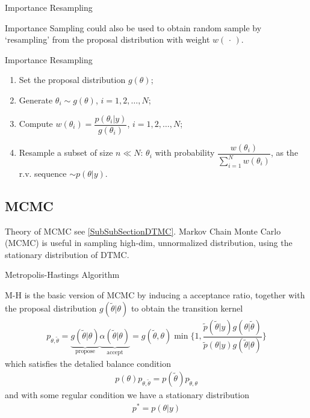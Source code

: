 \begin{point}
    Importance Resampling
\end{point}

Importance Sampling could also be used to obtain random sample by `resampling' from the proposal distribution with weight $ w(\, \cdot \, ) $.

\begin{algorithm}{Importance Resampling}
    \begin{enumerate}[topsep=2pt,itemsep=0pt]
        \item Set the proposal distribution $ g(\theta ) $;
        \item Generate $ \theta _i\sim g(\theta ) $, $ i=1,2,\ldots,N $;
        \item Compute $ w(\theta _i)=\dfrac{ p(\theta _i|y) }{ g(\theta _i) } $, $ i=1,2,\ldots,N $;
        \item Resample a subset of size $ n\ll N $: $ \theta _i $ with probability $ \dfrac{ w(\theta _i) }{ \sum_{i=1}^{N}w(\theta _i) }$, as the r.v. sequence $ \sim p(\theta |y) $.
    \end{enumerate}
\end{algorithm}


\subsection{MCMC}\label{SubSubSectionBayesianMCMC}
Theory of MCMC see \autoref{SubSubSectionDTMC}. Markov Chain Monte Carlo (MCMC) is useful in sampling high-dim, unnormalized distribution, using the stationary distribution of DTMC. 

\begin{point}
    Metropolis-Hastings Algorithm
\end{point}

M-H is the basic version of MCMC by inducing a acceptance ratio, together with the proposal distribution $ g(\tilde{\theta }|\theta  ) $ to obtain the transition kernel
\begin{align}
    p_{\theta ,\tilde{\theta } }=\underbrace{g(\tilde{\theta }|\theta  )}_{\text{propose}}\underbrace{\alpha (\tilde{\theta }|\theta )}_{\text{accept}}=g(\tilde{\theta },\theta )\min\big\{ 1, \dfrac{ \tilde{p}(\tilde{\theta }|y)g(\theta |\tilde{\theta }) }{ \tilde{p}(\theta |y)g(\tilde{\theta }|\theta ) }   \big\}
\end{align}
which satisfies the detalied balance condition
\begin{align}
    p(\theta )p_{\theta ,\tilde{\theta } }=p(\tilde{\theta })p_{\tilde{\theta },\theta }
\end{align}
and with some regular condition we have a stationary distribution
\begin{align}
    p^*=p(\theta |y) 
\end{align}

